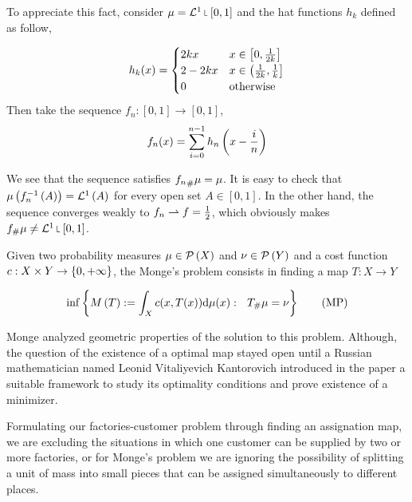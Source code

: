 To appreciate this fact, consider $\mu = \Lebesgue^1\measurerestr[0,1]$ and the hat functions $h_k$ defined as follow,

\begin{equation*}
	h_k(x)=\begin{cases}
		2kx & x\in\left[ 0, \frac{1}{2k} \right]\\
		2-2kx & x\in \left(\frac{1}{2k}, \frac{1}{k}\right] \\
		0 & \text{otherwise}
	\end{cases}
\end{equation*}
Then take the sequence $f_n:[0,1]\rightarrow [0,1]$,
\begin{equation}
	f_n(x)=\sum_{i=0}^{n-1}h_n\left( x-\frac{i}{n} \right)
\end{equation}


We see that the sequence satisfies ${f_{n}}_{\#} \mu=\mu$. It is easy to check that $\mu\left( f_n^{-1}\left(A\right) \right)=\mathcal{L}^1\left( A \right)$ for every open set $A\in [0,1]$. In the other hand, the sequence converges weakly to $f_n\rightharpoonup f=\frac{1}{2}$, which obviously makes $\Tmeasure{\mu}{f}\neq\Lebesgue^1\measurerestr [0,1]$. 


\begin{problem} Given two probability measures $\mu \in \mathcal{P}\left( X \right)$ and $\nu \in \mathcal{P}\left( Y \right)$ and a cost function $c: X \times Y \rightarrow \left\lbrace 0, +\infty \right\rbrace$, the Monge's problem consists in finding a map $T:X\rightarrow Y$
	
\begin{equation}
\inf\left\lbrace M\left(T\right):=\int_X c(x, T(x)) \mathrm{d} \mu(x): \ \ {T}_{\#} \mu=\nu  \right\rbrace\label{eq: Monge's Problem.}\tag{MP}
\end{equation}
\end{problem}

Monge analyzed geometric properties of the solution to this problem. Although, the question of the existence of a optimal map stayed open until a Russian mathematician named Leonid Vitaliyevich Kantorovich introduced in the paper \cite{Kantorovich1942} a suitable framework to study its optimality conditions and prove existence of a minimizer. 

Formulating our factories-customer problem through finding an assignation map, we are excluding the situations in which one customer can be supplied by two or more factories, or for Monge's problem we are ignoring the possibility of splitting a unit of mass into small pieces that can be assigned simultaneously to different places. 

